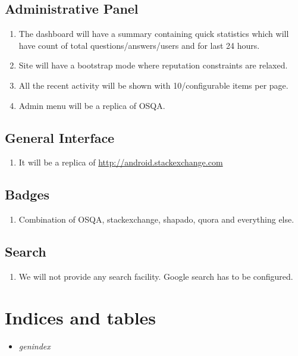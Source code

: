 \documentclass[letterpaper,10pt,english]{sphinxmanual}
\begin{document}
\section{Administrative Panel}
\label{req:administrative-panel}\begin{enumerate}
\item {} 
The dashboard will have a summary containing quick statistics which will
have count of total questions/answers/users and for last 24 hours.

\item {} 
Site will have a bootstrap mode where reputation constraints are relaxed.

\item {} 
All the recent activity will be shown with 10/configurable items per page.

\item {} 
Admin menu will be a replica of OSQA.

\end{enumerate}


\section{General Interface}
\label{req:general-interface}\begin{enumerate}
\item {} 
It will be a replica of \href{http://android.stackexchange.com}{http://android.stackexchange.com}

\end{enumerate}


\section{Badges}
\label{req:badges}\begin{enumerate}
\item {} 
Combination of OSQA, stackexchange, shapado, quora and everything else.

\end{enumerate}


\section{Search}
\label{req:search}\begin{enumerate}
\item {} 
We will not provide any search facility. Google search has to be configured.

\end{enumerate}


\chapter{Indices and tables}
\label{index:indices-and-tables}\begin{itemize}
\item {} 
\emph{genindex}

\end{itemize}



\renewcommand{\indexname}{Index}
\printindex
\end{document}

